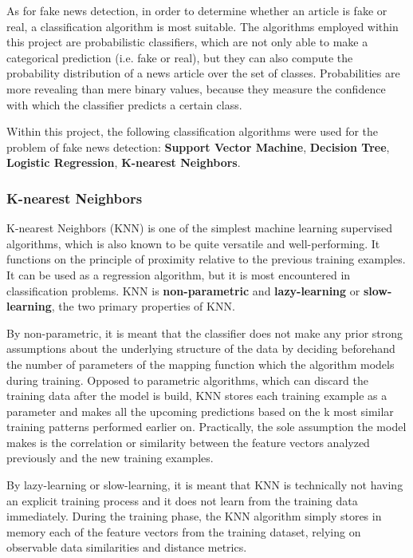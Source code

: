 As for fake news detection, in order to determine whether an article is fake or real, a classification algorithm is most suitable. The algorithms employed within this project are probabilistic classifiers, which are not only able to make a categorical prediction (i.e. fake or real), but they can also compute the probability distribution of a news article over the set of classes. Probabilities are more revealing than mere binary values, because they measure the confidence with which the classifier predicts a certain class.

Within this project, the following classification algorithms were used for the problem of fake news detection: \textbf{Support Vector Machine}, \textbf{Decision Tree}, \textbf{Logistic Regression}, \textbf{K-nearest Neighbors}. 

\subsubsection{K-nearest Neighbors}
K-nearest Neighbors (KNN) is one of the simplest machine learning supervised algorithms, which is also known to be quite versatile and well-performing. It functions on the principle of proximity relative to the previous training examples. It can be used as a regression algorithm, but it is most encountered in classification problems. KNN is \textbf{non-parametric} and \textbf{lazy-learning} or \textbf{slow-learning}, the two primary properties of KNN. 

By non-parametric, it is meant that the classifier does not make any prior strong assumptions about the underlying structure of the data by deciding beforehand the number of parameters of the mapping function which the algorithm models during training. Opposed to parametric algorithms, which can discard the training data after the model is build, KNN stores each training example as a parameter and makes all the upcoming predictions based on the k most similar training patterns performed earlier on. Practically, the sole assumption the model makes is the correlation or similarity between the feature vectors analyzed previously and the new training examples.

By lazy-learning or slow-learning, it is meant that KNN is technically not having an explicit training process and it does not learn from the training data immediately. During the training phase, the KNN algorithm simply stores in memory each of the feature vectors from the training dataset, relying on observable data similarities and distance metrics.

